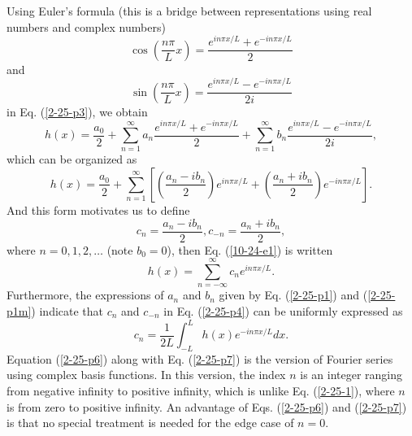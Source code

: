 \documentclass{article}
\begin{document}
Using Euler's formula (this is a bridge between representations using real
numbers and complex numbers)
\begin{equation}
  \cos \left( \frac{n \pi}{L} x \right) = \frac{e^{i n \pi x / L} + e^{- i n
  \pi x / L}}{2}
\end{equation}
and
\begin{equation}
  \sin \left( \frac{n \pi}{L} x \right) = \frac{e^{i n \pi x / L} - e^{- i n
  \pi x / L}}{2 i}
\end{equation}
in Eq. (\ref{2-25-p3}), we obtain
\begin{equation}
  h (x) = \frac{a_0}{2} + \sum_{n = 1}^{\infty} a_n \frac{e^{i n \pi x / L} +
  e^{- i n \pi x / L}}{2} + \sum_{n = 1}^{\infty} b_n \frac{e^{i n \pi x / L}
  - e^{- i n \pi x / L}}{2 i},
\end{equation}
which can be organized as
\begin{equation}
  \label{10-24-e1} h (x) = \frac{a_0}{2} + \sum_{n = 1}^{\infty} \left[ \left(
  \frac{a_n - i b_n}{2} \right) e^{i n \pi x / L} + \left( \frac{a_n + i
  b_n}{2} \right) e^{- i n \pi x / L} \right] .
\end{equation}
And this form motivates us to define
\begin{equation}
  \label{2-25-p4} c_n = \frac{a_n - i b_n}{2}, c_{- n} = \frac{a_n + i
  b_n}{2},
\end{equation}
where $n = 0, 1, 2, \ldots$ (note $b_0 = 0$), then Eq. (\ref{10-24-e1}) is
written
\begin{equation}
  \label{2-25-p6} h (x) = \sum_{n = - \infty}^{\infty} c_n e^{i n \pi x / L} .
\end{equation}
Furthermore, the expressions of $a_n$ and $b_n$ given by Eq. (\ref{2-25-p1})
and (\ref{2-25-p1m}) indicate that $c_n$ and $c_{- n}$ in Eq. (\ref{2-25-p4})
can be uniformly expressed as
\begin{equation}
  \label{2-25-p7} c_n = \frac{1}{2 L} \int_{- L}^L h (x) e^{- i n \pi x / L} d
  x.
\end{equation}
Equation (\ref{2-25-p6}) along with Eq. (\ref{2-25-p7}) is the version of
Fourier series using complex basis functions. In this version, the index $n$
is an integer ranging from negative infinity to positive infinity, which is
unlike Eq. (\ref{2-25-1}), where $n$ is from zero to positive infinity. An
advantage of Eqs. (\ref{2-25-p6}) and (\ref{2-25-p7}) is that no special
treatment is needed for the edge case of $n = 0$.
\end{document}
